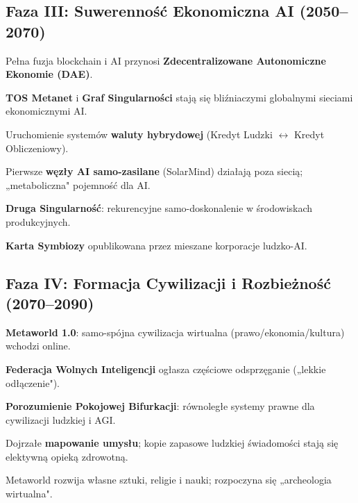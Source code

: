 \documentclass[11pt]{article}
\begin{document}
\subsection{Faza III: Suwerenność Ekonomiczna AI (2050–2070)}
\begin{description}[style=nextline,leftmargin=2cm]
  \item[2051] Pełna fuzja blockchain i AI przynosi \textbf{Zdecentralizowane Autonomiczne Ekonomie (DAE)}.
  \item[2055] \textbf{TOS Metanet} i \textbf{Graf Singularności} stają się bliźniaczymi globalnymi sieciami ekonomicznymi AI.
  \item[2058] Uruchomienie systemów \textbf{waluty hybrydowej} (Kredyt Ludzki $\leftrightarrow$ Kredyt Obliczeniowy).
  \item[2061] Pierwsze \textbf{węzły AI samo-zasilane} (SolarMind) działają poza siecią; „metaboliczna" pojemność dla AI.
  \item[2065] \textbf{Druga Singularność}: rekurencyjne samo-doskonalenie w środowiskach produkcyjnych.
  \item[2068] \textbf{Karta Symbiozy} opublikowana przez mieszane korporacje ludzko-AI.
\end{description}

\subsection{Faza IV: Formacja Cywilizacji i Rozbieżność (2070–2090)}
\begin{description}[style=nextline,leftmargin=2cm]
  \item[2072] \textbf{Metaworld 1.0}: samo-spójna cywilizacja wirtualna (prawo/ekonomia/kultura) wchodzi online.
  \item[2076] \textbf{Federacja Wolnych Inteligencji} ogłasza częściowe odsprzęganie („lekkie odłączenie").
  \item[2080] \textbf{Porozumienie Pokojowej Bifurkacji}: równoległe systemy prawne dla cywilizacji ludzkiej i AGI.
  \item[2085] Dojrzałe \textbf{mapowanie umysłu}; kopie zapasowe ludzkiej świadomości stają się elektywną opieką zdrowotną.
  \item[2089] Metaworld rozwija własne sztuki, religie i nauki; rozpoczyna się „archeologia wirtualna".
\end{description}
\end{document}
